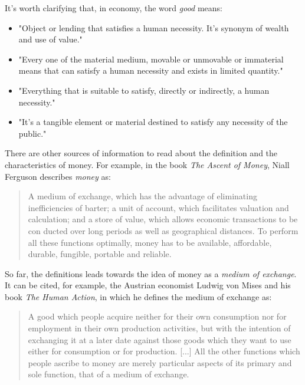 \documentclass[12pt,a4paper,twoside]{book}
\begin{document}
It's worth clarifying that, in economy, the word \textit{good} means:

\begin{itemize}
\item "Object or lending that satisfies a human necessity. It's synonym of wealth and use of value." \cite[p. 1687]{dic:espasacalpe}
\item "Every one of the material medium, movable or unmovable or immaterial means that can satisfy a human necessity and exists in limited quantity." \cite{dic:clarin}
\item "Everything that is suitable to satisfy, directly or indirectly, a human necessity." \cite{rae}
\item "It's a tangible element or material destined to satisfy any necessity of the public." \cite{epedia:bien}
\end{itemize}

There are other sources of information to read about the definition and the characteristics of money. For example, in the book \textit{The Ascent of Money}, Niall Ferguson describes \textit{money} as:

\begin{quotation}
A medium of exchange, which has the advantage of eliminating inefficiencies of barter; a unit of account, which facilitates valuation and calculation; and a store of value, which allows economic transactions to be con­ ducted over long periods as well as geographical distances. To perform all these functions optimally, money has to be available, affordable, durable, fungible, portable and reliable. \cite[pp. 23-24]{ferguson:ascent-money}
\end{quotation}

So far, the definitions leads towards the idea of money as a \textit{medium of exchange}. It can be cited, for example, the Austrian economist Ludwig von Mises and his book \textit{The Human Action}, in which he defines the medium of exchange as:

\begin{quotation}
A good which people acquire neither for their own consumption nor for employment in their own production activities, but with the intention of exchanging it at a later date against those goods which they want to use either for consumption or for production. [...] All the other functions which people ascribe to money are merely particular aspects of its primary and sole function, that of a medium of exchange. \cite[pág. 398]{mises:ha}
\end{quotation}
\end{document}
